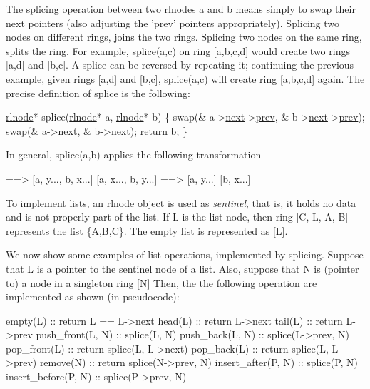 The splicing operation between two rlnodes a and b means simply to swap their {\ttfamily next} pointers (also adjusting the 'prev' pointers appropriately). Splicing two nodes on different rings, joins the two rings. Splicing two nodes on the same ring, splits the ring. For example, {\ttfamily splice(a,c)} on ring \mbox{[}a,b,c,d\mbox{]} would create two rings \mbox{[}a,d\mbox{]} and \mbox{[}b,c\mbox{]}. A splice can be reversed by repeating it; continuing the previous example, given rings \mbox{[}a,d\mbox{]} and \mbox{[}b,c\mbox{]}, splice(a,c) will create ring \mbox{[}a,b,c,d\mbox{]} again. The precise definition of splice is the following\-: 
\begin{DoxyCode}
\hyperlink{structresource__list__node}{rlnode}* splice(\hyperlink{structresource__list__node}{rlnode}* a, \hyperlink{structresource__list__node}{rlnode}* b) \{
    swap(& a->\hyperlink{structresource__list__node_a04b1ee9524cd800f14de2925141e3762}{next}->\hyperlink{structresource__list__node_a280b77fdcee186bcaade02f76322d183}{prev}, & b->\hyperlink{structresource__list__node_a04b1ee9524cd800f14de2925141e3762}{next}->\hyperlink{structresource__list__node_a280b77fdcee186bcaade02f76322d183}{prev});
    swap(& a->\hyperlink{structresource__list__node_a04b1ee9524cd800f14de2925141e3762}{next}, & b->\hyperlink{structresource__list__node_a04b1ee9524cd800f14de2925141e3762}{next});
    \textcolor{keywordflow}{return} b;
\}
\end{DoxyCode}
 In general, {\ttfamily splice(a,b)} applies the following transformation \begin{DoxyVerb}[a, x...]  [b, y...]   ==>   [a, y..., b, x...]
[a, x..., b, y...]     ==>   [a, y...]  [b, x...]
\end{DoxyVerb}


To implement lists, an rlnode object is used as {\itshape sentinel}, that is, it holds no data and is not properly part of the list. If L is the list node, then ring \mbox{[}C, L, A, B\mbox{]} represents the list \{A,B,C\}. The empty list is represented as \mbox{[}L\mbox{]}.

We now show some examples of list operations, implemented by splicing. Suppose that L is a pointer to the sentinel node of a list. Also, suppose that N is (pointer to) a node in a singleton ring \mbox{[}N\mbox{]} Then, the the following operation are implemented as shown (in pseudocode)\-: \begin{DoxyVerb}empty(L)              ::  return  L == L->next
head(L)               ::  return  L->next
tail(L)               ::  return  L->prev
push_front(L, N)      ::  splice(L, N)
push_back(L, N)       ::  splice(L->prev, N)
pop_front(L)          ::  return splice(L, L->next)
pop_back(L)           ::  return splice(L, L->prev) 
remove(N)             ::  return splice(N->prev, N)
insert_after(P, N)    ::  splice(P, N)
insert_before(P, N)   ::  splice(P->prev, N)
\end{DoxyVerb}


